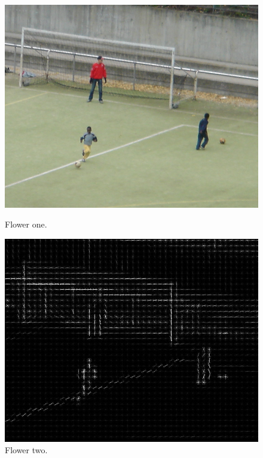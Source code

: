 
\begin{figure}[H]
	\centering
	\begin{minipage}[b]{0.45\textwidth}
		\includegraphics[width=\textwidth]{Bilder/hog1crop.png}
		\caption{Flower one.}
	\end{minipage}
	\hfill
	\begin{minipage}[b]{0.45\textwidth}
		\includegraphics[width=\textwidth]{Bilder/hog2crop.jpg}
		\caption{Flower two.}
	\end{minipage}
\end{figure}